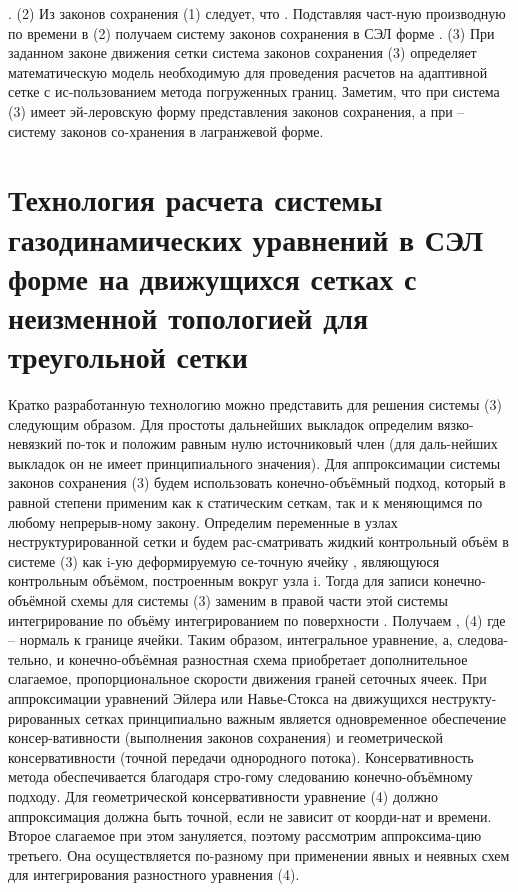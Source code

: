 .	(2)
Из законов сохранения (1) следует, что  . Подставляя част-ную производную по времени в (2) получаем систему законов сохранения в СЭЛ форме
.	(3)
При заданном законе движения сетки   система законов сохранения (3) определяет математическую модель необходимую для проведения расчетов на адаптивной сетке с ис-пользованием метода погруженных границ. Заметим, что при   система (3) имеет эй-леровскую форму представления законов сохранения, а при   – систему законов со-хранения в лагранжевой форме.

\section{Технология расчета системы газодинамических уравнений в СЭЛ форме на движущихся сетках с неизменной топологией для треугольной сетки}
Кратко разработанную технологию можно представить для решения системы (3) следующим образом. Для простоты дальнейших выкладок определим вязко-невязкий по-ток   и положим равным нулю источниковый член (для даль-нейших выкладок он не имеет принципиального значения). Для аппроксимации системы законов сохранения (3) будем использовать конечно-объёмный подход, который в равной степени применим как к статическим сеткам, так и к меняющимся по любому непрерыв-ному закону. Определим переменные в узлах неструктурированной сетки и будем рас-сматривать жидкий контрольный объём   в системе (3) как i-ую деформируемую се-точную ячейку  , являющуюся контрольным объёмом, построенным вокруг узла i. Тогда для записи конечно-объёмной схемы для системы (3) заменим в правой части этой системы интегрирование по объёму интегрированием по поверхности  . Получаем
,	(4)
где   – нормаль к границе ячейки. Таким образом, интегральное уравнение, а, следова-тельно, и конечно-объёмная разностная схема приобретает дополнительное слагаемое, пропорциональное скорости движения граней сеточных ячеек.
При аппроксимации уравнений Эйлера или Навье-Стокса на движущихся неструкту-рированных сетках принципиально важным является одновременное обеспечение консер-вативности (выполнения законов сохранения) и геометрической консервативности (точной передачи однородного потока). Консервативность метода обеспечивается благодаря стро-гому следованию конечно-объёмному подходу. Для геометрической консервативности уравнение (4) должно аппроксимация должна быть точной, если   не зависит от коорди-нат и времени. Второе слагаемое при этом зануляется, поэтому рассмотрим аппроксима-цию третьего. Она осуществляется по-разному при применении явных и неявных схем для интегрирования разностного уравнения (4).
